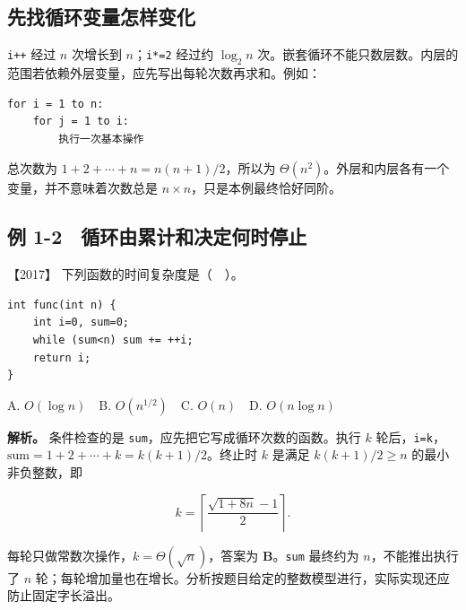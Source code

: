 \subsection{先找循环变量怎样变化}\label{ds-c01-h41}

\allowbreak{}\texttt{i++} 经过 \(n\) 次增长到 \(n\)；\allowbreak{}\texttt{i*=2} 经过约 \(\log_2n\) 次。嵌套循环不能只数层数。内层的范围若依赖外层变量，应先写出每轮次数再求和。例如：

\par\medskip\noindent
\begin{minipage}{\linewidth}
\begin{verbatim}
for i = 1 to n:
    for j = 1 to i:
        执行一次基本操作
\end{verbatim}
\end{minipage}\par\medskip

总次数为 \(1+2+\cdots+n=n(n+1)/2\)，所以为 \(\Theta(n^2)\)。外层和内层各有一个变量，并不意味着次数总是 \(n\times n\)，只是本例最终恰好同阶。


\subsection{例 1-2　循环由累计和决定何时停止}\label{ds-ex1-2}

\noindent{}【2017】 下列函数的时间复杂度是（　）。

\par\medskip\noindent
\begin{minipage}{\linewidth}
\begin{verbatim}
int func(int n) {
    int i=0, sum=0;
    while (sum<n) sum += ++i;
    return i;
}
\end{verbatim}
\end{minipage}\par\medskip

A. \(O(\log n)\)　B. \(O(n^{1/2})\)　C. \(O(n)\)　D. \(O(n\log n)\)


\textbf{解析。} 条件检查的是 \allowbreak{}\texttt{sum}，应先把它写成循环次数的函数。执行 \(k\) 轮后，\allowbreak{}\texttt{i=k}，\(\mathrm{sum}=1+2+\cdots+k=k(k+1)/2\)。终止时 \(k\) 是满足 \(k(k+1)/2\ge n\) 的最小非负整数，即

\[k=\left\lceil\frac{\sqrt{1+8n}-1}{2}\right\rceil.\]

每轮只做常数次操作，\(k=\Theta(\sqrt n)\)，答案为 \textbf{B}。\allowbreak{}\texttt{sum} 最终约为 \(n\)，不能推出执行了 \(n\) 轮；每轮增加量也在增长。分析按题目给定的整数模型进行，实际实现还应防止固定字长溢出。


